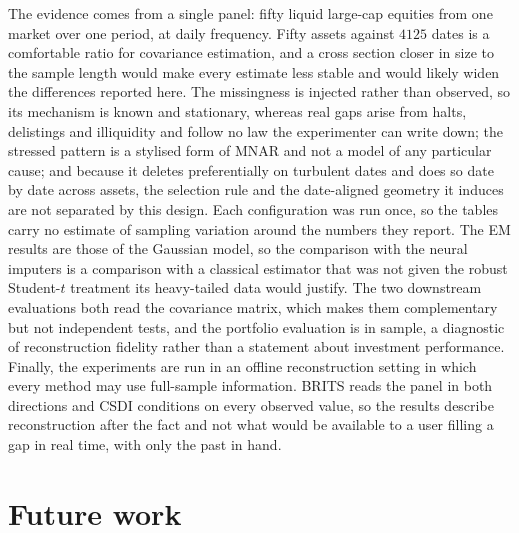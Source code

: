 The evidence comes from a single panel: fifty liquid large-cap equities from one
market over one period, at daily frequency. Fifty assets against $4125$ dates is
a comfortable ratio for covariance estimation, and a cross section closer in size
to the sample length would make every estimate less stable and would likely widen
the differences reported here. The missingness is injected rather than observed,
so its mechanism is known and stationary, whereas real gaps arise from halts,
delistings and illiquidity and follow no law the experimenter can write down; the
stressed pattern is a stylised form of MNAR and not a model of any particular
cause; and because it deletes preferentially on turbulent dates and does so date
by date across assets, the selection rule and the date-aligned geometry it
induces are not separated by this design. Each configuration was run once, so the
tables carry no estimate of sampling variation around the numbers they report.
The EM results are those of the Gaussian model, so the comparison with the neural
imputers is a comparison with a classical estimator that was not given the robust
Student-$t$ treatment its heavy-tailed data would justify. The two downstream evaluations
both read the covariance matrix, which makes them complementary but not
independent tests, and the portfolio evaluation is in sample, a diagnostic of
reconstruction fidelity rather than a statement about investment performance.
Finally, the experiments are run in an offline reconstruction setting in which
every method may use full-sample information. BRITS reads the panel in both
directions and CSDI conditions on every observed value, so the results describe
reconstruction after the fact and not what would be available to a user filling a
gap in real time, with only the past in hand.

\section{Future work}

